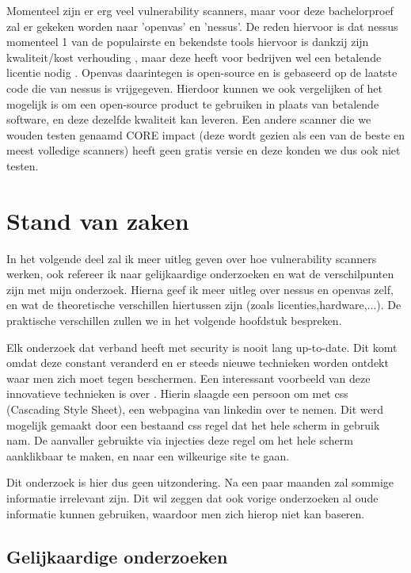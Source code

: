 Momenteel zijn er erg veel vulnerability scanners, maar voor deze bachelorproef zal er gekeken worden naar 'openvas' en 'nessus'. De reden hiervoor is dat nessus momenteel 1 van de populairste en bekendste tools hiervoor is dankzij zijn kwaliteit/kost verhouding \textcite{Sectools}, maar deze heeft voor bedrijven wel een betalende licentie nodig \textcite{Tenable}. Openvas daarintegen is open-source en is gebaseerd op de laatste code die van nessus is vrijgegeven. Hierdoor kunnen we ook vergelijken of het mogelijk is om een open-source product te gebruiken in plaats van betalende software, en deze dezelfde kwaliteit kan leveren. Een andere scanner die we wouden testen genaamd CORE impact (deze wordt gezien als een van de beste en meest volledige scanners) heeft geen gratis versie en deze konden we dus ook niet testen.

\section{Stand van zaken}
\label{sec:stand-van-zaken}

In het volgende deel zal ik meer uitleg geven over hoe vulnerability scanners werken, ook refereer ik naar gelijkaardige onderzoeken en wat de verschilpunten zijn met mijn onderzoek. Hierna geef ik meer uitleg over nessus en openvas zelf, en wat de theoretische verschillen hiertussen zijn (zoals licenties,hardware,...).  De praktische verschillen zullen we in het volgende hoofdstuk bespreken.

Elk onderzoek dat verband heeft met security is nooit lang up-to-date. Dit komt omdat deze constant veranderd en er steeds nieuwe technieken worden ontdekt waar men zich moet tegen beschermen. Een interessant voorbeeld van deze innovatieve technieken is over \textcite{Linkedin}. Hierin slaagde een persoon om met css (Cascading Style Sheet), een webpagina van linkedin over te nemen. Dit werd mogelijk gemaakt door een bestaand css regel dat het hele scherm in gebruik nam. De aanvaller gebruikte via injecties deze regel om het hele scherm aanklikbaar te maken, en naar een wilkeurige site te gaan.

Dit onderzoek is hier dus geen uitzondering. Na een paar maanden zal sommige informatie irrelevant zijn. Dit wil zeggen dat ook vorige onderzoeken al oude informatie kunnen gebruiken, waardoor men zich hierop niet kan baseren.

\subsection{Gelijkaardige onderzoeken}

